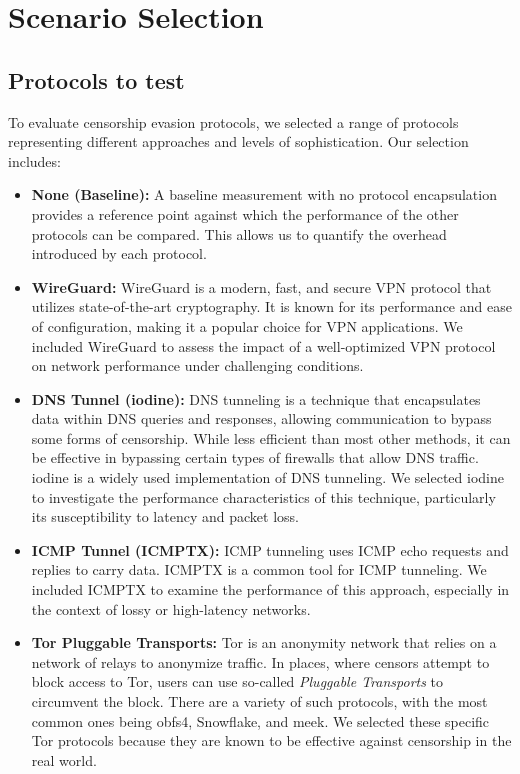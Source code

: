\section{Scenario Selection}
\subsection{Protocols to test}

To evaluate censorship evasion protocols, we selected a range of protocols representing different approaches and levels of sophistication.
Our selection includes:

\begin{itemize}
  \item \noindent\textbf{None (Baseline):}
    A baseline measurement with no protocol encapsulation provides a reference point against which the performance of the other protocols can be compared.
    This allows us to quantify the overhead introduced by each protocol.

  \item \noindent\textbf{WireGuard:}
    WireGuard is a modern, fast, and secure VPN protocol that utilizes state-of-the-art cryptography.
    It is known for its performance and ease of configuration, making it a popular choice for VPN applications.
    We included WireGuard to assess the impact of a well-optimized VPN protocol on network performance under challenging conditions.

  \item \noindent\textbf{DNS Tunnel (iodine):}
    DNS tunneling is a technique that encapsulates data within DNS queries and responses, allowing communication to bypass some forms of censorship.
    While less efficient than most other methods, it can be effective in bypassing certain types of firewalls that allow DNS traffic.
    iodine is a widely used implementation of DNS tunneling.
    We selected iodine to investigate the performance characteristics of this technique, particularly its susceptibility to latency and packet loss.

  \item \noindent\textbf{ICMP Tunnel (ICMPTX):}
    ICMP tunneling uses ICMP echo requests and replies to carry data.
    ICMPTX is a common tool for ICMP tunneling.
    We included ICMPTX to examine the performance of this approach, especially in the context of lossy or high-latency networks.

  \item \noindent\textbf{Tor Pluggable Transports:}
    Tor is an anonymity network that relies on a network of relays to anonymize traffic.
    In places, where censors attempt to block access to Tor, users can use so-called \textit{Pluggable Transports} to circumvent the block.
    There are a variety of such protocols, with the most common ones being obfs4, Snowflake, and meek.
    We selected these specific Tor protocols because they are known to be effective against censorship in the real world.
\end{itemize}



